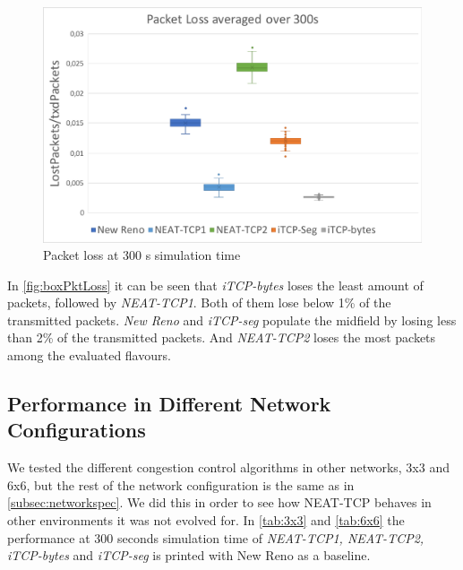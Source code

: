 \begin{figure}[h]
	\centering
	\includegraphics[width=1\textwidth]{boxPktLoss}
	\caption{Packet loss at 300 s simulation time}
	\label{fig:boxPktLoss}
\end{figure}
In \autoref{fig:boxPktLoss} it can be seen that \textit{iTCP-bytes} loses the least amount of packets, followed by \textit{NEAT-TCP1}. Both of them lose below 1\% of the transmitted packets. \textit{New Reno} and \textit{iTCP-seg} populate the midfield by losing less than 2\% of the transmitted packets. And \textit{NEAT-TCP2} loses the most packets among the evaluated flavours.

\subsection{Performance in Different Network Configurations}\label{subsec:perf3x3}
We tested the different congestion control algorithms in other networks, 3x3 and 6x6, but the rest of the network configuration is the same as in \autoref{subsec:networkspec}. We did this in order to see how NEAT-TCP behaves in other environments it was not evolved for. In \autoref{tab:3x3} and \autoref{tab:6x6} the performance at 300 seconds simulation time of \textit{NEAT-TCP1, NEAT-TCP2, iTCP-bytes} and \textit{iTCP-seg} is printed with New Reno as a baseline.

